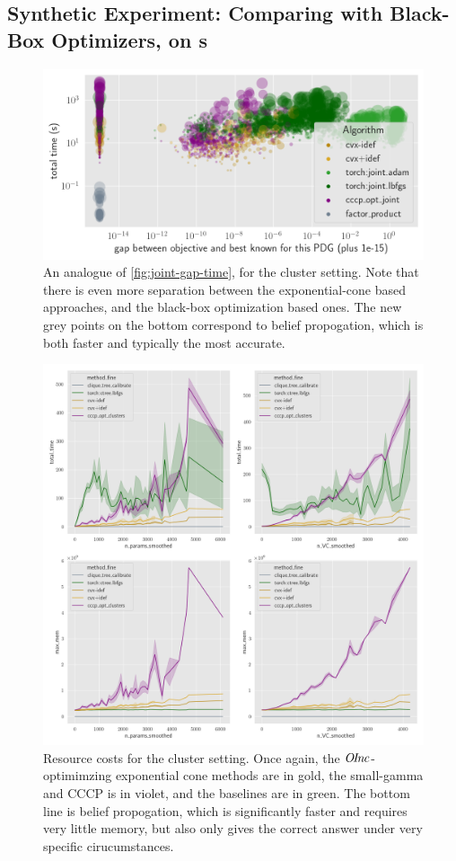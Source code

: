 \begin{subappendices}
\subsection{Synthetic Experiment: Comparing with Black-Box Optimizers, on \AcTree s} \label{sec:clus-expt-details}

\begin{figure}
    \centering
    \includegraphics[width=0.67\linewidth]{figs/rand-clus/gap-vs-time}
    \caption[Objective gap vs time in the cluster setting; shows more separation]
        {An analogue of \cref{fig:joint-gap-time}, for the cluster setting.
    Note that there is even more separation between the exponential-cone based approaches, and the black-box optimization based ones.
    The new grey points on the bottom correspond to belief propogation, which is both faster and typically the most accurate.}
    \label{fig:clus-gap-vs-time--appendix}
\end{figure}
\begin{figure}
    \centering
    \includegraphics[width=0.67\linewidth]{figs/rand-clus/resource-costs}
    \caption[Resource costs for the cluster setting.]
        {Resource costs for the cluster setting. Once again, the $\mathit{O\mskip-2.5muI\mskip-3.5mun\mskip-1.7muc}$-optimimzing exponential cone methods are in gold, the small-gamma and CCCP is in violet, and the baselines are in green. The bottom line is belief propogation, which is significantly faster and requires very little memory, but also only gives the correct answer under very specific cirucumstances.}
    \label{fig:clus-resource-costs}
\end{figure}



\end{subappendices}
